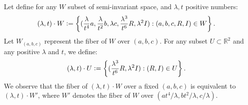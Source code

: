 \documentclass{article}
\newtheorem{lemma}[theorem]{Lemma}
\begin{document}


Let define for any $W$ subset of semi-invariant space, and $\lambda,t$ positive numbers:
\begin{equation}\label{expan-S}
    (\lambda,t)\cdot W \vcentcolon =\left\{(\frac{\lambda}{t^4}a,\frac{\lambda}{t^2}b, \lambda c,\frac{\lambda^3}{t^6}R,\lambda^2I): (a,b,c,R,I) \in W\right\}.
\end{equation} 
Let $W_{(a,b,c)}$ represent the fiber of $W$ over $(a, b, c)$.  For any subset $U \subset \mathbb{R}^2$ and any positive $\lambda$ and $t$, we define:
\begin{equation}\label{expan-S-fibe}
  (\lambda,t)\cdot U \vcentcolon=\left\{(\frac{\lambda^{3}}{t^6}R,\lambda^2I):(R,I)\in U\right\}. 
\end{equation}
We observe that the fiber of $(\lambda, t) \cdot W$ over a fixed $(a, b, c)$ is equivalent to $(\lambda, t) \cdot W'$, where $W'$ denotes the fiber of $W$ over $(at^4/\lambda, bt^2/\lambda, c/\lambda)$.
\end{document}
